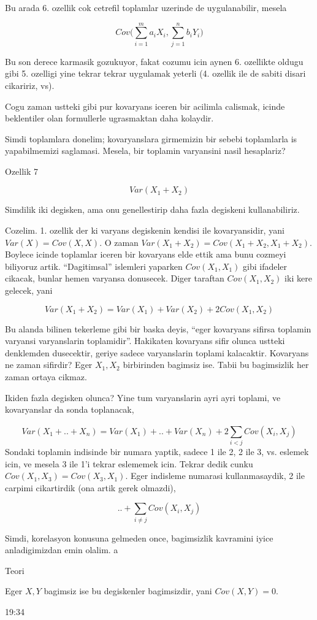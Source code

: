\documentclass[12pt,fleqn]{article}\usepackage{../common}
\begin{document}
Bu arada 6. ozellik cok cetrefil toplamlar uzerinde de uygulanabilir,
mesela 

$$ Cov \bigg( \sum _{i=1}^{m}a_iX_i, \sum _{j=1}^{n}b_iY_i \bigg) $$

Bu son derece karmasik gozukuyor, fakat cozumu icin aynen 6. ozellikte
oldugu gibi 5. ozelligi yine tekrar tekrar uygulamak yeterli (4. ozellik
ile de sabiti disari cikaririz, vs).

Cogu zaman ustteki gibi pur kovaryans iceren bir acilimla calismak, icinde
beklentiler olan formullerle ugrasmaktan daha kolaydir. 

Simdi toplamlara donelim; kovaryanslara girmemizin bir sebebi toplamlarla
is yapabilmemizi saglamasi. Mesela, bir toplamin varyansini nasil
hesaplariz? 

Ozellik 7

$$ Var(X_1+X_2) $$

Simdilik iki degisken, ama onu genellestirip daha fazla degiskeni
kullanabiliriz. 

Cozelim. 1. ozellik der ki varyans degiskenin kendisi ile kovaryansidir,
yani $Var(X) = Cov(X,X)$. O zaman $Var(X_1+X_2) = Cov(X_1+X_2,
X_1+X_2)$. 
Boylece icinde toplamlar iceren bir kovaryans elde ettik ama bunu cozmeyi 
biliyoruz artik. ``Dagitimsal'' islemleri yaparken $Cov(X_1,X_1)$ gibi
ifadeler cikacak, bunlar hemen varyansa donusecek. Diger taraftan
$Cov(X_1,X_2)$ iki kere gelecek, yani

$$ Var(X_1+X_2) = Var(X_1) + Var(X_2)  + 2 Cov(X_1,X_2)$$

Bu alanda bilinen tekerleme gibi bir baska deyis, ``eger kovaryans sifirsa
toplamin varyansi varyanslarin toplamidir''. Hakikaten kovaryans sifir
olunca ustteki denklemden dusecektir, geriye sadece varyanslarin toplami
kalacaktir. Kovaryans ne zaman sifirdir? Eger $X_1,X_2$ birbirinden
bagimsiz ise. Tabii bu bagimsizlik her zaman ortaya cikmaz. 

Ikiden fazla degisken olunca? Yine tum varyanslarin ayri ayri toplami, ve
kovaryanslar da sonda toplanacak,

$$ Var(X_1+ .. + X_n ) = Var(X_1) + .. + Var(X_n) + 2 \sum _{i<j}^{} Cov(X_i,X_j) $$
Sondaki toplamin indisinde bir numara yaptik, sadece 1 ile 2, 2 ile 3,
vs. eslemek icin, ve mesela 3 ile 1'i tekrar eslememek icin. Tekrar dedik
cunku $Cov(X_1,X_3) = Cov(X_3,X_1)$. Eger indisleme numarasi
kullanmasaydik, 2 ile carpimi cikartirdik (ona artik gerek olmazdi),

$$ ..  + \sum _{i \ne j} Cov(X_i,X_j) $$

Simdi, korelasyon konusuna gelmeden once, bagimsizlik kavramini iyice
anladigimizdan emin olalim. a 

Teori

Eger $X,Y$ bagimsiz ise bu degiskenler bagimsizdir, yani $Cov(X,Y)=0$.

19:34
\end{document}
